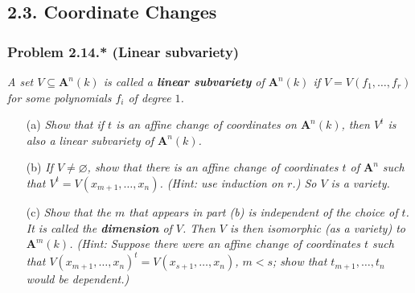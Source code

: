 \documentclass{article}
\begin{document}



\subsection*{2.3. Coordinate Changes \\}



\subsubsection*{Problem 2.14.* (Linear subvariety)}
\emph{A set $V \subseteq \mathbf{A}^n(k)$
is called a \textbf{linear subvariety} of $\mathbf{A}^n(k)$ if
$V = V(f_1,\ldots,f_r)$ for some polynomials $f_i$ of degree $1$.}

\begin{enumerate}
\item[(a)]
  \emph{Show that if $t$ is an affine change of coordinates on $\mathbf{A}^n(k)$,
  then $V^{t}$ is also a linear subvariety of $\mathbf{A}^n(k)$.}

\item[(b)]
  \emph{If $V \neq \varnothing$,
  show that there is an affine change of coordinates $t$ of $\mathbf{A}^n$
  such that $V^t = V(x_{m+1},\ldots,x_n)$.
  (Hint: use induction on $r$.)
  So $V$ is a variety.}

\item[(c)]
  \emph{Show that the $m$ that appears in part (b) is independent of the choice of $t$.
  It is called the \textbf{dimension} of $V$.
  Then $V$ is then isomorphic (as a variety) to $\mathbf{A}^m(k)$.
  (Hint: Suppose there were an affine change of coordinates $t$ such that
  $V(x_{m+1},\ldots,x_n)^{t} = V(x_{s+1},\ldots,x_n)$, $m < s$;
  show that $t_{m+1},\ldots,t_n$ would be dependent.)} \\
\end{enumerate}
\end{document}
